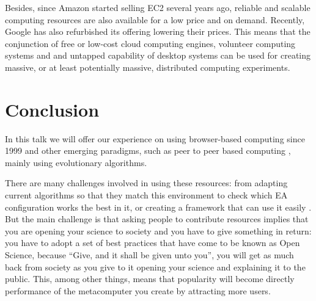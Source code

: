\documentclass{svmult}
\begin{document}
Besides, since Amazon started selling EC2 several years ago, reliable and scalable computing resources are also available for a low price and on demand. Recently, Google has also refurbished its offering lowering their prices. This means that the conjunction of free or low-cost cloud computing engines, volunteer computing systems and and untapped capability of desktop systems can be used for creating massive, or at least potentially massive, distributed computing experiments.

\section{Conclusion}

In this talk we will offer our experience on using browser-based computing since 1999 \cite{jesusIWANN99} and other emerging paradigms, such as peer to peer based computing \cite{evag:gpem}, mainly using evolutionary algorithms. 

There are many challenges involved in using these resources: from adapting current algorithms so that they match this environment \cite{agajaj} to check which EA configuration works the best in it, or creating a framework that can use it easily \cite{nodeo2014}. But the main challenge is that asking people to contribute resources implies that you are opening your science to society and you have to give something in return: you have to adopt a set of best practices that have come to be known as Open Science, because ``Give, and it shall be given unto you'', you will get as much back from society as you give to it opening your science and explaining it to the public. This, among other things, means that popularity will become directly performance of the metacomputer you create by attracting more users.





\end{document}
